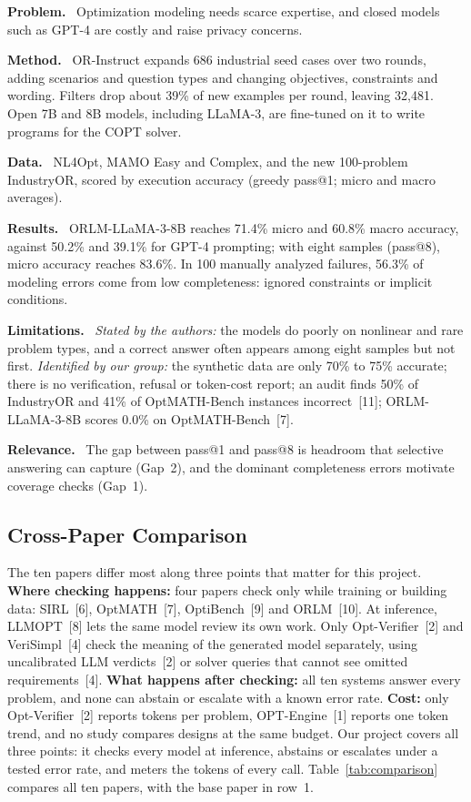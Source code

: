 \documentclass[11pt,a4paper]{article}
\newcommand{\elem}[1]{\par\noindent\textbf{#1.}~}
\begin{document}
\elem{Problem} Optimization modeling needs scarce expertise, and closed models such as GPT-4 are costly and raise privacy concerns.
\elem{Method} OR-Instruct expands 686 industrial seed cases over two rounds, adding scenarios and question types and changing objectives, constraints and wording. Filters drop about 39\% of new examples per round, leaving 32,481. Open 7B and 8B models, including LLaMA-3, are fine-tuned on it to write programs for the COPT solver.
\elem{Data} NL4Opt, MAMO Easy and Complex, and the new 100-problem IndustryOR, scored by execution accuracy (greedy pass@1; micro and macro averages).
\elem{Results} ORLM-LLaMA-3-8B reaches 71.4\% micro and 60.8\% macro accuracy, against 50.2\% and 39.1\% for GPT-4 prompting; with eight samples (pass@8), micro accuracy reaches 83.6\%. In 100 manually analyzed failures, 56.3\% of modeling errors come from low completeness: ignored constraints or implicit conditions.
\elem{Limitations} \textit{Stated by the authors:} the models do poorly on nonlinear and rare problem types, and a correct answer often appears among eight samples but not first. \textit{Identified by our group:} the synthetic data are only 70\% to 75\% accurate; there is no verification, refusal or token-cost report; an audit finds 50\% of IndustryOR and 41\% of OptMATH-Bench instances incorrect~[11]; ORLM-LLaMA-3-8B scores 0.0\% on OptMATH-Bench~[7].
\elem{Relevance} The gap between pass@1 and pass@8 is headroom that selective answering can capture (Gap~2), and the dominant completeness errors motivate coverage checks (Gap~1).

\subsection{Cross-Paper Comparison}
\label{sec:comparison}

The ten papers differ most along three points that matter for this project. \textbf{Where checking happens:} four papers check only while training or building data: SIRL~[6], OptMATH~[7], OptiBench~[9] and ORLM~[10]. At inference, LLMOPT~[8] lets the same model review its own work. Only Opt-Verifier~[2] and VeriSimpl~[4] check the meaning of the generated model separately, using uncalibrated LLM verdicts~[2] or solver queries that cannot see omitted requirements~[4]. \textbf{What happens after checking:} all ten systems answer every problem, and none can abstain or escalate with a known error rate. \textbf{Cost:} only Opt-Verifier~[2] reports tokens per problem, OPT-Engine~[1] reports one token trend, and no study compares designs at the same budget. Our project covers all three points: it checks every model at inference, abstains or escalates under a tested error rate, and meters the tokens of every call. Table~\ref{tab:comparison} compares all ten papers, with the base paper in row~1.
\end{document}
